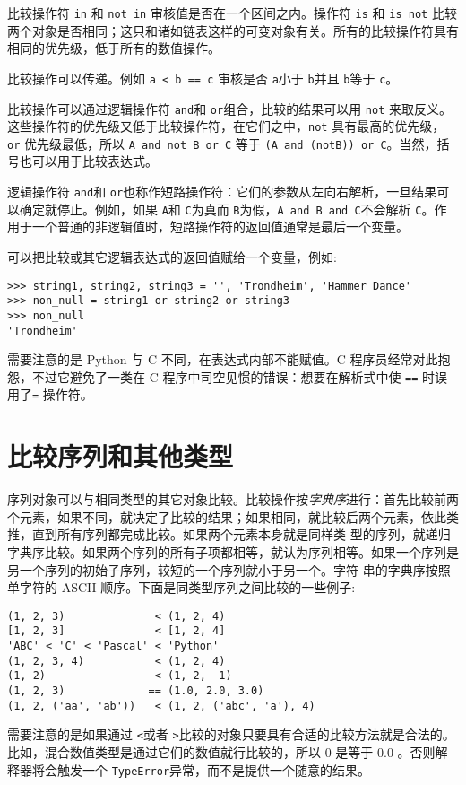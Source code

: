 比较操作符 \texttt{in} 和 \texttt{not in} 审核值是否在一个区间之内。操作符 \texttt{is} 和 \texttt{is not} 比较两个对象是否相同；这只和诸如链表这样的可变对象有关。所有的比较操作符具有相同的优先级，低于所有的数值操作。

比较操作可以传递。例如 \cprotect\texttt{a \verb|<| b \verb|==| c} 审核是否 \texttt{a}小于 \texttt{b}并且 \texttt{b}等于 \texttt{c}。

比较操作可以通过逻辑操作符 \texttt{and}和 \texttt{or}组合，比较的结果可以用 \texttt{not} 来取反义。这些操作符的优先级又低于比较操作符，在它们之中，\texttt{not} 具有最高的优先级， \texttt{or} 优先级最低，所以 \texttt{A and not B or C} 等于 \texttt{(A and (notB)) or C}。当然，括号也可以用于比较表达式。

逻辑操作符 \texttt{and}和 \texttt{or}也称作短路操作符：它们的参数从左向右解析，一旦结果可以确定就停止。例如，如果 \texttt{A}和 \texttt{C}为真而 \texttt{B}为假，\texttt{A and B and C}不会解析 \texttt{C}。作用于一个普通的非逻辑值时，短路操作符的返回值通常是最后一个变量。

可以把比较或其它逻辑表达式的返回值赋给一个变量，例如:
\begin{lstlisting}
>>> string1, string2, string3 = '', 'Trondheim', 'Hammer Dance'
>>> non_null = string1 or string2 or string3
>>> non_null
'Trondheim'
\end{lstlisting}
需要注意的是 Python 与 C 不同，在表达式内部不能赋值。C 程序员经常对此抱怨，不过它避免了一类在 C 程序中司空见惯的错误：想要在解析式中使 \verb|==| 时误用了\verb|=| 操作符。
\section{比较序列和其他类型}
序列对象可以与相同类型的其它对象比较。比较操作按\emph{字典序}进行：首先比较前两个元素，如果不同，就决定了比较的结果；如果相同，就比较后两个元素，依此类推，直到所有序列都完成比较。如果两个元素本身就是同样类 型的序列，就递归字典序比较。如果两个序列的所有子项都相等，就认为序列相等。如果一个序列是另一个序列的初始子序列，较短的一个序列就小于另一个。字符 串的字典序按照单字符的 ASCII 顺序。下面是同类型序列之间比较的一些例子:
\begin{lstlisting}
(1, 2, 3)              < (1, 2, 4)
[1, 2, 3]              < [1, 2, 4]
'ABC' < 'C' < 'Pascal' < 'Python'
(1, 2, 3, 4)           < (1, 2, 4)
(1, 2)                 < (1, 2, -1)
(1, 2, 3)             == (1.0, 2.0, 3.0)
(1, 2, ('aa', 'ab'))   < (1, 2, ('abc', 'a'), 4)
\end{lstlisting}
需要注意的是如果通过 \verb|<|或者 \verb|>|比较的对象只要具有合适的比较方法就是合法的。比如，混合数值类型是通过它们的数值就行比较的，所以 0 是等于 0.0 。否则解释器将会触发一个 \texttt{TypeError}异常，而不是提供一个随意的结果。
